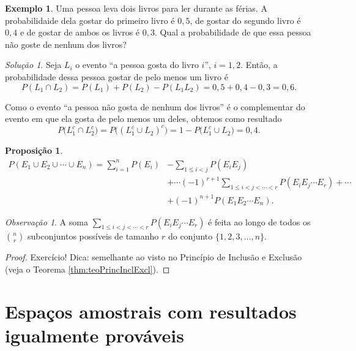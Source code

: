 \documentclass[]{book}
\newtheorem{proposition}{Proposição}[chapter]
\theoremstyle{definition}
\theoremstyle{definition}
\newtheorem{example}{Exemplo}[chapter]
\theoremstyle{definition}
\theoremstyle{remark}
\newtheorem*{remark}{Observação}
\newtheorem*{solution}{Solução}
\begin{document}
\begin{example}
\protect\hypertarget{exm:unnamed-chunk-99}{}{\label{exm:unnamed-chunk-99} }Uma pessoa leva dois livros para ler durante as férias.
A probabilidaide dela gostar do primeiro livro é \(0{,}5\), de gostar do segundo livro é \(0{,}4\) e de gostar de ambos os livros é \(0{,}3\).
Qual a probabilidade de que essa pessoa não goste de nenhum dos livros?
\end{example}

\begin{solution}
\iffalse{} {Solução. } \fi{}Seja \(L_i\) o evento ``a pessoa gosta do livro \(i\)'', \(i=1,2\).
Então, a probabilidade dessa pessoa gostar de pelo menos um livro é
\[P(L_1 \cap L_2) = P(L_1) + P(L_2) - P(L_1L_2) = 0{,}5+0{,}4-0{,}3=0{,}6.\]

Como o evento ``a pessoa não gosta de nenhum dos livros'' é o complementar do evento em que ela gosta de pelo menos um deles, obtemos como resultado
\[P\big(L_1^c \cap L_2^c\big) = P\big((L_1^c \cup L_2)^c\big) = 1 - P\big(L_1^c \cup L_2\big) = 0{,}4.\]
\end{solution}

\begin{proposition}
\protect\hypertarget{prp:propInclusaoExclusao}{}{\label{prp:propInclusaoExclusao} }\begin{align}
P(E_1\cup E_2 \cup\cdots\cup E_n) = \sum_{i=1}^{n}P(E_i) &- \sum_{1\leq i <j}P(E_i E_j) \\
&+ \cdots (-1)^{r+1}\sum_{1\leq i <j<\cdots<r}^{}P(E_i E_j \cdots E_r) +\cdots  \\
&+(-1)^{n+1}P(E_1 E_2 \cdots E_n).
\end{align}
\end{proposition}

\begin{remark}
\iffalse{} {Observação. } \fi{}A soma \(\sum_{1\leq i <j<\cdots<r}^{}P(E_i E_j \cdots E_r)\) é feita ao longo de todos os \({n \choose r}\) subconjuntos possíveis de tamanho \(r\) do conjunto \(\{1,2,3,\ldots, n\}.\)
\end{remark}

\begin{proof}
\iffalse{} {Prova. } \fi{}Exercício!
Dica: semelhante ao visto no Princípio de Inclusão e Exclusão (veja o Teorema \ref{thm:teoPrincInclExcl}).
\end{proof}

\hypertarget{espauxe7os-amostrais-com-resultados-igualmente-provuxe1veis}{%
\section{Espaços amostrais com resultados igualmente prováveis}\label{espauxe7os-amostrais-com-resultados-igualmente-provuxe1veis}}
\end{document}
